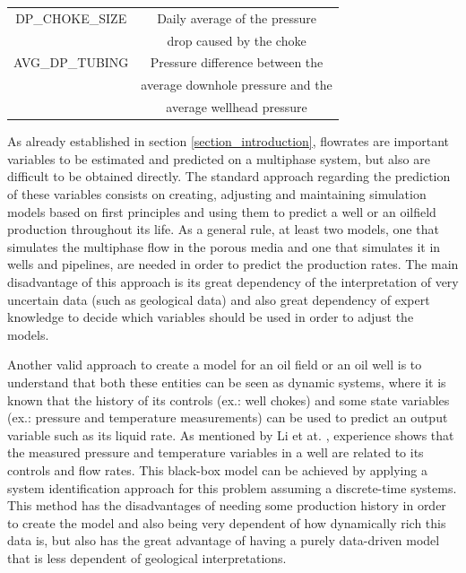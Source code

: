 \documentclass[conference]{IEEEtran}
\begin{document}
\begin{table}[htbp]
\begin{center}
\begin{tabular}{|c|c|}
\hline
DP\_CHOKE\_SIZE            &   Daily average of the pressure \\
                           &   drop caused by the choke \\
\hline
AVG\_DP\_TUBING            &   Pressure difference between the\\
                           &   average downhole pressure and the \\
                           &   average wellhead pressure \\
\hline
\end{tabular}
\label{volve_variables}
\end{center}
\end{table}

As already established in section \ref{section_introduction}, flowrates are important variables to be estimated and predicted on a multiphase system, but also are difficult to be obtained directly. The standard approach regarding the prediction of these variables consists on creating, adjusting and maintaining simulation models based on first principles and using them to predict a well or an oilfield production throughout its life. As a general rule, at least two models, one that simulates the multiphase flow in the porous media and one that simulates it in wells and pipelines, are needed in order to predict the production rates. The main disadvantage of this approach is its great dependency of the interpretation of very uncertain data (such as geological data) and also great dependency of expert knowledge to decide which variables should be used in order to adjust the models.

Another valid approach to create a model for an oil field or an oil well is to understand that both these entities can be seen as dynamic systems, where it is known that the history of its controls (ex.: well chokes) and some state variables (ex.: pressure and temperature measurements) can be used to predict an output variable such as its liquid rate. As mentioned by Li et at. \cite{Li2019}, experience shows that the measured pressure and temperature variables in a well are related to its controls and flow rates. This black-box model can be achieved by applying a system identification approach for this problem assuming a discrete-time systems. This method has the disadvantages of needing some production history in order to create the model and also being very dependent of how dynamically rich this data is, but also has the great advantage of having a purely data-driven model that is less dependent of geological interpretations.
\end{document}
